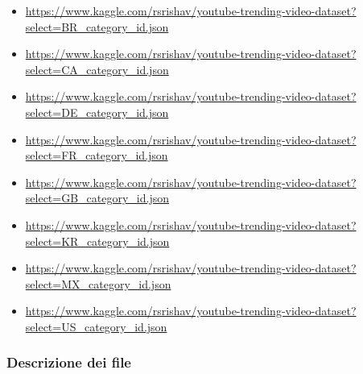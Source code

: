 \documentclass[10pt]{article}
\begin{document}
\begin{itemize}
\begin{itemize}
        \item \url{https://www.kaggle.com/rsrishav/youtube-trending-video-dataset?select=BR_category_id.json}
        \item \url{https://www.kaggle.com/rsrishav/youtube-trending-video-dataset?select=CA_category_id.json}
        \item \url{https://www.kaggle.com/rsrishav/youtube-trending-video-dataset?select=DE_category_id.json}
        \item \url{https://www.kaggle.com/rsrishav/youtube-trending-video-dataset?select=FR_category_id.json}
        \item \url{https://www.kaggle.com/rsrishav/youtube-trending-video-dataset?select=GB_category_id.json}
        \item \url{https://www.kaggle.com/rsrishav/youtube-trending-video-dataset?select=KR_category_id.json}
        \item \url{https://www.kaggle.com/rsrishav/youtube-trending-video-dataset?select=MX_category_id.json}
        \item \url{https://www.kaggle.com/rsrishav/youtube-trending-video-dataset?select=US_category_id.json}
    \end{itemize}
\end{itemize}

\subsubsection{Descrizione dei file}
\end{document}

